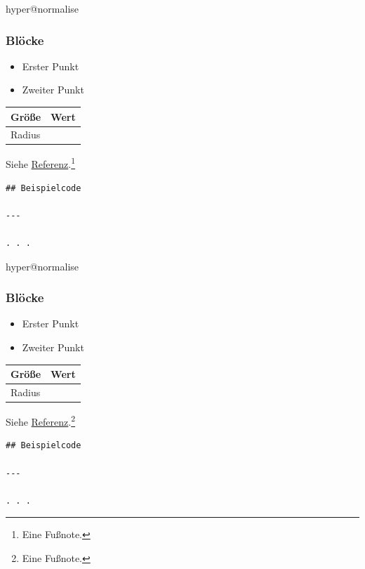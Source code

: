 \ifcsname hyper@normalise\endcsname\else\PackageError{mark2tex}{Markdown links require hyperref}{Load \string\usepackage{hyperref} in the document preamble.}\fi
\begin{frame}[t,fragile]
\frametitle{Blöcke}

\begin{itemize}
\item Erster Punkt
\item Zweiter Punkt
\end{itemize}

\par\addvspace{\medskipamount}
\noindent\begin{tabularx}{\linewidth}{@{}>{\raggedright\arraybackslash}X>{\raggedleft\arraybackslash}X@{}}
\toprule
Größe & Wert \\
\midrule
Radius & 2 \\
\bottomrule
\end{tabularx}
\par\addvspace{\medskipamount}

Siehe \href{\detokenize{https://example.org}}{Referenz}.\footnote{\label{mark2tex:footnote:3d2bdb32491d5a65b133d158edfeba11:1}Eine Fußnote.}

\begin{verbatim}
## Beispielcode

---

. . .
\end{verbatim}


\end{frame}

\ifcsname hyper@normalise\endcsname\else\PackageError{mark2tex}{Markdown links require hyperref}{Load \string\usepackage{hyperref} in the document preamble.}\fi
\begin{frame}[t,fragile]
\frametitle{Blöcke}

\begin{itemize}
\item Erster Punkt
\item Zweiter Punkt
\end{itemize}

\par\addvspace{\medskipamount}
\noindent\begin{tabularx}{\linewidth}{@{}>{\raggedright\arraybackslash}X>{\raggedleft\arraybackslash}X@{}}
\toprule
Größe & Wert \\
\midrule
Radius & 2 \\
\bottomrule
\end{tabularx}
\par\addvspace{\medskipamount}

Siehe \href{\detokenize{https://example.org}}{Referenz}.\footnote{\label{mark2tex:footnote:3d2bdb32491d5a65b133d158edfeba11:1}Eine Fußnote.}

\begin{verbatim}
## Beispielcode

---

. . .
\end{verbatim}


\end{frame}

